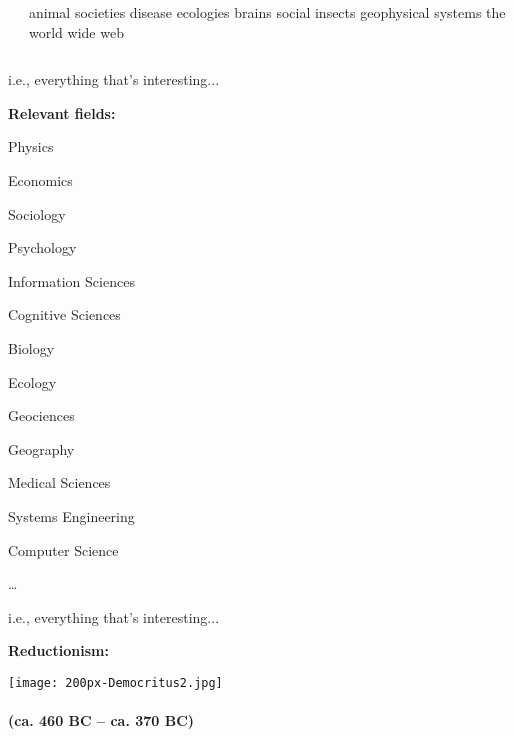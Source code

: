 \begin{frame}[plain]
\begin{columns}[t]
\begin{column}{0.45\textwidth}
      \end{column} 
      \begin{column}{0.45\textwidth} 
        
         animal societies     
         disease ecologies    
         brains               
         social insects       
         geophysical systems  
         the world wide web   
        
      \end{column} 
    \end{columns} 
  

  
  
    i.e., everything that's interesting...
  



  \textbf{Relevant fields:}

  
          
      
       
        Physics
       
        Economics
       
        Sociology
       
        Psychology
       
        Information Sciences
      
      
      
      
       
        Cognitive Sciences
       
        Biology
       
        Ecology
       
        Geociences
       
        Geography
      
      
      
      
       
        Medical Sciences
       
        Systems Engineering
       
        Computer Science
       
      \ldots
      
      

  
  
    i.e., everything that's interesting...
  


  \textbf{Reductionism:}

      
    \texttt{[image: 200px-Democritus2.jpg]}\\
    
    \textbf{
    \\
    (ca. 460 BC -- ca. 370 BC)
  }
    

\end{frame}
